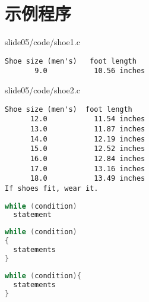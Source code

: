 \section{示例程序}

\begin{frame}\ft{\secname}
  
  {slide05/code/shoe1.c} 

\end{frame}


\begin{frame}[fragile]\ft{\secname}
\begin{lstlisting}[backgroundcolor=\color{red!10}]
Shoe size (men's)   foot length
       9.0           10.56 inches
\end{lstlisting}
\end{frame}


\begin{frame}\ft{\secname}
  
  {slide05/code/shoe2.c} 
\end{frame}



\begin{frame}[fragile]\ft{\secname}
\begin{lstlisting}[backgroundcolor=\color{red!10}]
Shoe size (men's)  foot length
      12.0           11.54 inches
      13.0           11.87 inches
      14.0           12.19 inches
      15.0           12.52 inches
      16.0           12.84 inches
      17.0           13.16 inches
      18.0           13.49 inches
If shoes fit, wear it.
\end{lstlisting}
\end{frame}


\begin{frame}[fragile]
\begin{lstlisting}[language=c,frame=single]
while (condition)
  statement
\end{lstlisting}

\begin{lstlisting}[language=c,frame=single]
while (condition)
{
  statements
}
\end{lstlisting}

\begin{lstlisting}[language=c,frame=single]
while (condition){
  statements
}
\end{lstlisting}


\end{frame}


